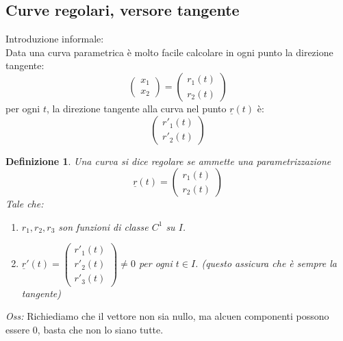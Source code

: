 \documentclass{scrreprt}
\newtheorem{defn}{Definizione}
\newenvironment{definition}{\begin{mdframed}[backgroundcolor=Ivory2]\begin{defn}}{\end{defn}\end{mdframed}}
\begin{document}

\subsection{Curve regolari, versore tangente}
Introduzione informale:\\
Data una curva parametrica è molto facile calcolare in ogni punto la direzione tangente:
\begin{equation}
	\left( \begin{array}{c} x_1 \\ x_2 \end{array} \right) = \left( \begin{array}{c} r_1(t) \\ r_2(t) \end{array} \right) 
\end{equation}
per ogni $t$, la direzione tangente alla curva nel punto $\underline{r}(t)$ è:
\begin{equation}
	\left( \begin{array}{c} r'_1(t) \\ r'_2(t) \end{array} \right)
\end{equation}

\begin{definition}
	Una curva si dice regolare se ammette una parametrizzazione
	\begin{equation}
		\underline{r}(t) = \left( \begin{array}{c} r_1(t) \\ r_2(t) \end{array} \right)
	\end{equation}
	Tale che:
	\begin{enumerate}
		\item[$i)$] $r_1, r_2, r_3$ son funzioni di classe $C^1$ su $I$.
		\item[$ii)$] $\underline{r}'(t) = \left( \begin{array}{c} r'_1(t) \\ r'_2(t) \\ r'_3(t) \end{array} \right) \neq 0$ per ogni $t \in I$. (questo assicura che è sempre la tangente)
	\end{enumerate}
\end{definition}

\emph{Oss:} Richiediamo che il vettore non sia nullo, ma alcuen componenti possono essere 0, basta che non lo siano tutte.
\end{document}
